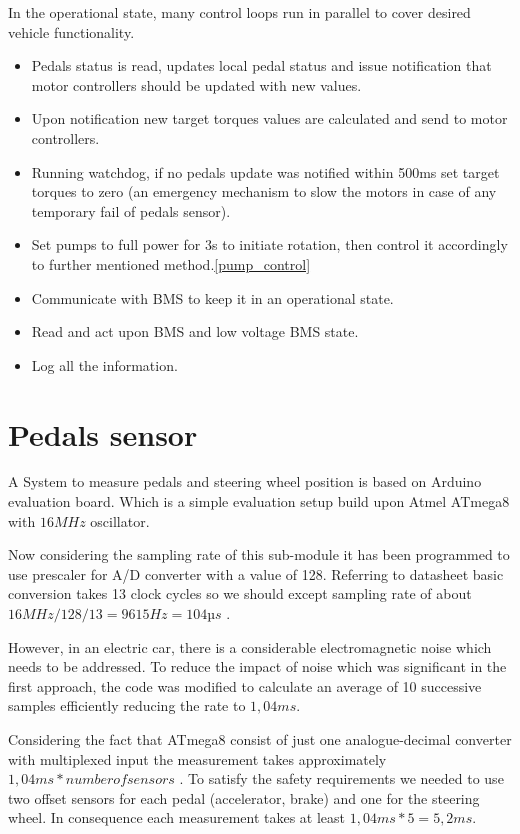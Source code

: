 In the operational state, many control loops run in parallel to cover desired vehicle functionality.
\begin{itemize}
    \item Pedals status is read, updates local pedal status and issue notification that motor controllers should be updated with new values. 
    \item Upon notification new target torques values are calculated and send to motor controllers.
    \item Running watchdog, if no pedals update was notified within 500ms set target torques to zero (an emergency mechanism to slow the motors in case of any temporary fail of pedals sensor).
    \item Set pumps to full power for 3s to initiate rotation, then control it accordingly to further mentioned method.\ref{pump_control}
    \item Communicate with BMS to keep it in an operational state.
    \item Read and act upon BMS and low voltage BMS state.
    \item Log all the information.
\end{itemize}


\section{Pedals sensor}
A System to measure pedals and steering wheel position is based on Arduino evaluation board. Which is a simple evaluation setup build upon Atmel ATmega8 with $16MHz$ oscillator.

Now considering the sampling rate of this sub-module it has been programmed to use prescaler for A/D converter with a value of 128. Referring to datasheet basic conversion takes 13 clock cycles so we should except sampling rate of about $16MHz/128/13 = 9615Hz = 104µs$ \cite{Atmega8}.

However, in an electric car, there is a considerable electromagnetic noise which needs to be addressed. To reduce the impact of noise which was significant in the first approach, the code was modified to calculate an average of 10 successive samples efficiently reducing the rate to $1,04ms$.

Considering the fact that ATmega8 consist of just one analogue-decimal converter with multiplexed input the measurement takes approximately $1,04ms * number of sensors$ \cite{Atmega8}.
To satisfy the safety requirements we needed to use two offset sensors for each pedal (accelerator, brake) and one for the steering wheel. In consequence each measurement takes at least $1,04ms * 5 = 5,2ms$.

